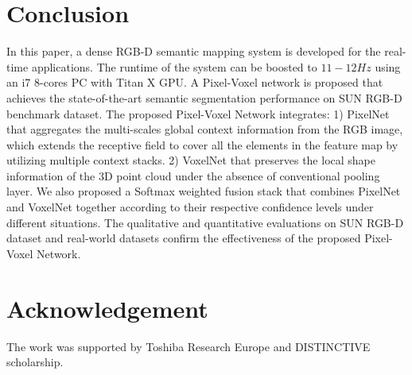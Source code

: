 \documentclass[letterpaper, 10 pt, conference]{ieeeconf}
\begin{document}
\section{Conclusion}\label{sec:5}
In this paper, a dense RGB-D semantic mapping system is developed for the real-time applications. The runtime of the system can be boosted to $11-12Hz$ using an i7 8-cores PC with Titan X GPU. A  Pixel-Voxel network is proposed that achieves the state-of-the-art semantic segmentation performance on SUN RGB-D benchmark dataset. The proposed Pixel-Voxel Network integrates: 1) PixelNet that aggregates the multi-scales global context information from the RGB image, which extends the receptive field to cover all the elements in the feature map by utilizing multiple context stacks. 2) VoxelNet that preserves the local shape information of the 3D point cloud under the absence of conventional pooling layer. We also proposed a Softmax weighted fusion stack that combines PixelNet and VoxelNet together according to their respective confidence levels under different situations. The qualitative and quantitative evaluations on SUN RGB-D dataset and real-world datasets confirm the effectiveness of the proposed Pixel-Voxel Network. 

\section{Acknowledgement}
The work was supported by Toshiba Research Europe and DISTINCTIVE scholarship.

%

\end{document}
